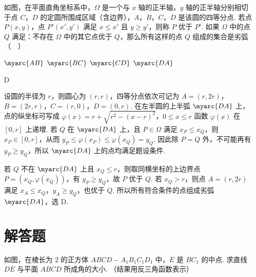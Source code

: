 \begin{problem}
如图，在平面直角坐标系中，\(\Omega\) 是一个与 \(x\) 轴的正半轴，\(y\) 轴的正半轴分别相切于点 \(C\)，\(D\) 的定圆所围成区域（含边界），\(A\)，\(B\)，\(C\)，\(D\) 是该圆的四等分点. 若点 \(P(x, y)\)，点 \(P'(x', y')\) 满足 \(x \leqslant x'\) 且 \(y \geqslant y'\)，则称 \(P\) 优于 \(P'\). 如果 \(\Omega\) 中的点 \(Q\) 满足：不存在 \(\Omega\) 中的其它点优于 \(Q\)，那么所有这样的点 \(Q\) 组成的集合是劣弧（\(\quad\)）


\choices
    {\(\myarc{AB}\)}
    {\(\myarc{BC}\)}
    {\(\myarc{CD}\)}
    {\(\myarc{DA}\)}
\end{problem}

\begin{answer}
D
\end{answer}

\begin{solution}
设圆的半径为 \(r\)，则圆心为 \((r,r)\)，四等分点依次可记为 \(A=(r,2r)\)，\(B=(2r,r)\)，\(C=(r,0)\)，\(D=(0,r)\). 在左半圆的上半弧 \(\myarc{DA}\) 上，点的纵坐标可写成
\(\varphi(x)=r+\sqrt{r^2-(x-r)^2}\)，\(0\leqslant x\leqslant r\)
函数 \(\varphi(x)\) 在 \([0,r]\) 上递增. 若 \(Q\) 在 \(\myarc{DA}\) 上，且 \(P\in\Omega\) 满足 \(x_P\leqslant x_Q\)，则 \(x_P\in[0,r]\)，从而 \(y_P\leqslant\varphi(x_P)\leqslant\varphi(x_Q)=y_Q\). 因此除 \(P=Q\) 外，不可能再有 \(y_P\geqslant y_Q\)，所以 \(\myarc{DA}\) 上的点均满足题设条件.

若 \(Q\) 不在 \(\myarc{DA}\) 上且 \(x_Q\leqslant r\)，则取同横坐标的上边界点 \(P=(x_Q,\varphi(x_Q))\)，有 \(y_P\geqslant y_Q\)，故 \(P\) 优于 \(Q\). 若 \(x_Q>r\)，则点 \(A=(r,2r)\) 满足 \(x_A\leqslant x_Q\)，\(y_A\geqslant y_Q\)，也优于 \(Q\). 所以所有符合条件的点组成劣弧 \(\myarc{DA}\)，选 D.
\end{solution}

\section{解答题}

\begin{problem}
如图，在棱长为 \(2\) 的正方体 \(ABCD - A_{1}B_{1}C_{1}D_{1}\) 中，\(E\) 是 \(BC_{1}\) 的中点. 求直线 \(DE\) 与平面 \(ABCD\) 所成角的大小. （结果用反三角函数表示）

\end{problem}

